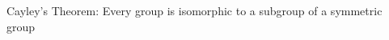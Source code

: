 \documentclass[preview]{standalone}
\begin{document}
\begin{center}
Cayley's Theorem: Every group is isomorphic to a subgroup of a symmetric group
\end{center}
\end{document}
